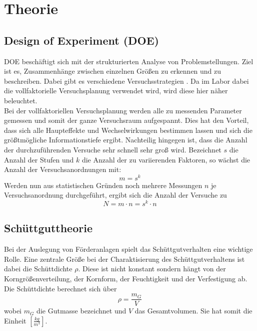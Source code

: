 \chapter{Theorie}
\label{sec: Hauptkapitel 1}

\section{Design of Experiment (DOE)}
	\noindent
	DOE beschäftigt sich mit der strukturierten Analyse von Problemstellungen.
	Ziel ist es, Zusammenhänge zwischen einzelnen Größen zu erkennen und zu
	beschreiben. Dabei gibt es verschiedene Versuchsstrategien \cite{ref:DOE_IL}.
	Da im Labor dabei die vollfaktorielle Versuchsplanung verwendet wird, wird
	diese hier näher beleuchtet.
	\\

	\noindent
	Bei der vollfaktoriellen Versuchsplanung werden alle zu messenden Parameter
	gemessen und somit der ganze Versuchsraum aufgespannt. Dies hat den Vorteil,
	dass sich alle Haupteffekte und Wechselwirkungen bestimmen lassen und sich die
	größtmögliche Informationstiefe ergibt.
	Nachteilig hingegen ist, dass die Anzahl der durchzuführenden Versuche sehr
	schnell sehr groß wird. Bezeichnet $s$ die Anzahl der Stufen und $k$ die Anzahl
	der zu variierenden Faktoren, so wächst die Anzahl der Versuchsanordnungen mit:
	\begin{equation}
		m = s^k
		\label{eq: Versuchsanordnungen}
	\end{equation}
	Werden nun aus statistischen Gründen noch mehrere Messungen $n$ je
	Versuchsanordnung durchgeführt, ergibt sich die Anzahl der Versuche zu
	\begin{equation}
		N = m \cdot n = s^k \cdot n
		\label{eq: Versuchsanzahl}
	\end{equation}

\section{Schüttguttheorie \cite{ref:Stat_Versuchsplanung}}
	\noindent
	Bei der Auslegung von Förderanlagen spielt das Schüttgutverhalten eine wichtige
	Rolle. Eine zentrale Größe bei der Charaktisierung des Schüttgutverhaltens ist
	dabei die Schüttdichte $\rho$. Diese ist nicht konstant sondern hängt von der
	Korngrößenverteilung, der Kornform, der Feuchtigkeit und der Verfestigung ab.
	Die Schüttdichte berechnet sich über
	\begin{equation}
		\rho = \frac{m_G}{V}
		\label{eq: Schüttdichte}
	\end{equation}
	\noindent
	wobei $m_G$ die Gutmasse bezeichnet und $V$ das Gesamtvolumen. Sie hat somit
	die Einheit
	$\left[ \frac{kg}{m^3} \right]$.
	\\

